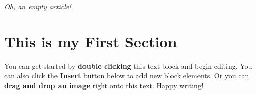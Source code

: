 \documentclass[11pt, twoside, a4paper]{article}
\begin{document}
\textit{Oh, an empty article!} 

\section{This is my First Section}

You can get started by \textbf{double clicking} this text block and begin editing. You can also click the \textbf{Insert} button below to add new block elements. Or you can \textbf{drag and drop an image} right onto this text. Happy writing!
\end{document}
